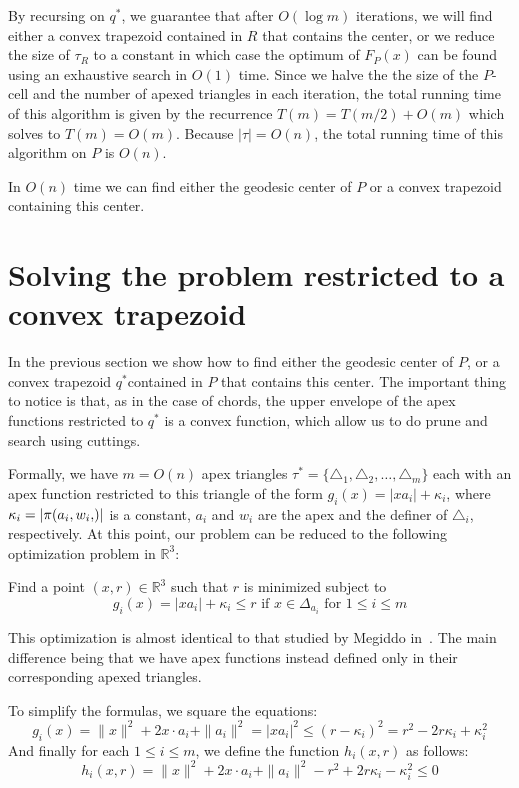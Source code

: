 \documentclass[a4paper,UKenglish]{lipics}
\newcommand{\F}[2]{\ensuremath{F_{\scriptscriptstyle #1}(#2)}}
\newcommand{\g}[2]{\ensuremath{|\pi(#1, #2)|}}
\begin{document}
By recursing on $q^*$, we guarantee that after $O(\log m)$ iterations, we will find either a convex trapezoid contained in $R$ that contains the center, or we reduce the size of $\tau_R$ to a constant in which case the optimum of $\F{P}{x}$ can be found using an exhaustive search in $O(1)$ time. Since we halve the the size of the $P$-cell and the number of apexed triangles in each iteration, the total running time of this algorithm is given by the recurrence $T(m) = T(m/2) + O(m)$ which solves to $T(m) = O(m)$. 
Because $|\tau| = O(n)$, the total running time of this algorithm on $P$ is $O(n)$.

\begin{lemma}\label{lemma:Finding the convex trapezoid}
In $O(n)$ time we can find either the geodesic center of $P$ or a convex trapezoid containing this center.
\end{lemma}


\section{Solving the problem restricted to a convex trapezoid}
In the previous section we show how to find either the geodesic center of $P$, or a convex trapezoid $q^*$contained in $P$ that contains this center. The important thing to notice is that, as in the case of chords, the upper envelope of the apex functions restricted to $q^*$ is a convex function, which allow us to do prune and search using cuttings.

Formally, we have $m = O(n)$ apex triangles $\tau^* = \{\triangle_{1}, \triangle_{2}, \ldots, \triangle_{m}\}$ each with an apex function restricted to this triangle of the form $g_i(x) = |x a_i| + \kappa_i$, where $\kappa_i = \g{a_i, w_i}$ is a constant, $a_i$ and $w_i$ are the apex and the definer of $\triangle_i$, respectively.
At this point, our problem can be reduced to the following optimization problem in $\mathbb{R}^3$:

Find a point $(x,r)\in \mathbb{R}^3$ such that $r$ is minimized subject to
$$\text{$g_i(x) = |x a_i| + \kappa_i \leq r$ if $x\in \Delta_{a_i}$ for $1\leq i \leq m$}$$

This optimization is almost identical to that studied by Megiddo in~\cite{megiddo1989ball}. 
The main difference being that we have apex functions instead defined only in their corresponding apexed triangles. 

To simplify the formulas, we square the equations:
$$g_i(x) = \|x\|^2 + 2x\cdot a_i + \|a_i\|^2  = |x a_i|^2 \leq (r - \kappa_i)^2 = r^2 - 2r\kappa_i + \kappa_i^2$$ 
And finally for each $1\leq i\leq m$, we define the function $h_i(x, r)$ as follows:
$$h_i(x, r) = \|x\|^2 + 2x\cdot a_i + \|a_i\|^2  - r^2 + 2r\kappa_i - \kappa_i^2 \leq 0$$
\end{document}
